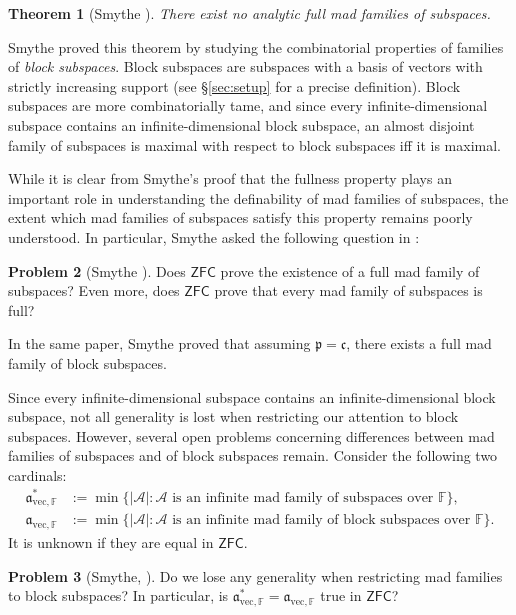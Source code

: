 \documentclass[11pt,reqno]{amsart}
\theoremstyle{plain}
\numberwithin{equation}{section}
\newtheorem{theorem}{Theorem}[section]
\theoremstyle{definition}
\newtheorem{prob}[theorem]{Problem}
\newcommand{\cal}{\mathcal}
\renewcommand{\frak}{\mathfrak}
\newcommand{\ZFC}{\mathsf{ZFC}}
\newcommand{\A}{\cal{A}}
\newcommand{\avec}{\frak{a}_{\mathrm{vec},\mathbb{F}}}
\let\Sec\S
\renewcommand{\S}{\mathcal{S}}
\begin{document}
\begin{theorem}[Smythe \cite{S19}]
\label{thm:mad.not.analytic}
    There exist no analytic full mad families of subspaces.
\end{theorem}

Smythe proved this theorem by studying the combinatorial properties of families of \emph{block subspaces}. Block subspaces are subspaces with a basis of vectors with strictly increasing support (see \Sec\ref{sec:setup} for a precise definition). Block subspaces are more combinatorially tame, and since every infinite-dimensional subspace contains an infinite-dimensional block subspace, an almost disjoint family of subspaces is maximal with respect to block subspaces iff it is maximal. 

While it is clear from Smythe's proof that the fullness property plays an important role in understanding the definability of mad families of subspaces, the extent which mad families of subspaces satisfy this property remains poorly understood. In particular, Smythe asked the following question in \cite{S19}:

\begin{prob}[Smythe \cite{S19}]
\label{prob:full.mad.families}
    Does $\ZFC$ prove the existence of a full mad family of subspaces? Even more, does $\ZFC$ prove that every mad family of subspaces is full?
\end{prob}

In the same paper, Smythe proved that assuming $\frak{p} = \frak{c}$, there exists a full mad family of block subspaces.

Since every infinite-dimensional subspace contains an infinite-dimensional block subspace, not all generality is lost when restricting our attention to block subspaces. However, several open problems concerning differences between mad families of subspaces and of block subspaces remain. Consider the following two cardinals:
\begin{align*}
    \avec^* &:= \min\{|\A| : \text{$\A$ is an infinite mad family of subspaces over $\mathbb{F}$}\}, \\
    \avec &:= \min\{|\A| : \text{$\A$ is an infinite mad family of block subspaces over $\mathbb{F}$}\}.
\end{align*}
It is unknown if they are equal in $\ZFC$.

\begin{prob}[Smythe, \cite{S19}]
\label{prob:avec*.and.avec}
    Do we lose any generality when restricting mad families to block subspaces? In particular, is $\avec^* = \avec$ true in $\ZFC$?
\end{prob}
\end{document}
